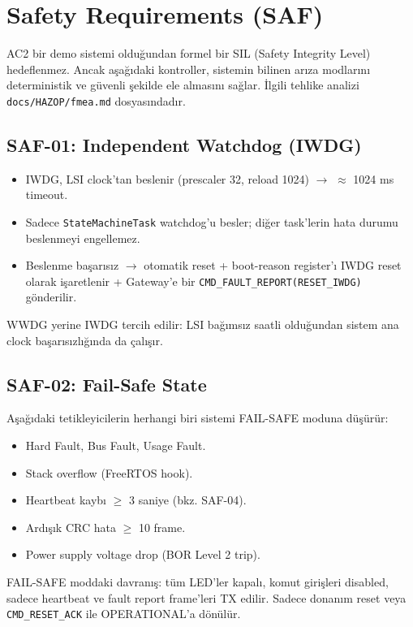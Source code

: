 \section{Safety Requirements (SAF)}

AC2 bir demo sistemi olduğundan formel bir SIL (Safety Integrity Level) hedeflenmez. Ancak aşağıdaki kontroller, sistemin bilinen arıza modlarını deterministik ve güvenli şekilde ele almasını sağlar. İlgili tehlike analizi \texttt{docs/HAZOP/fmea.md} dosyasındadır.

\subsection{SAF-01: Independent Watchdog (IWDG)}
\begin{itemize}
    \item IWDG, LSI clock'tan beslenir (prescaler 32, reload 1024) $\rightarrow$ $\approx$ 1024 ms timeout.
    \item Sadece \texttt{StateMachineTask} watchdog'u besler; diğer task'lerin hata durumu beslenmeyi engellemez.
    \item Beslenme başarısız $\rightarrow$ otomatik reset + boot-reason register'ı IWDG reset olarak işaretlenir + Gateway'e bir \texttt{CMD\_FAULT\_REPORT(RESET\_IWDG)} gönderilir.
\end{itemize}
WWDG yerine IWDG tercih edilir: LSI bağımsız saatli olduğundan sistem ana clock başarısızlığında da çalışır.

\subsection{SAF-02: Fail-Safe State}
Aşağıdaki tetikleyicilerin herhangi biri sistemi FAIL-SAFE moduna düşürür:
\begin{itemize}
    \item Hard Fault, Bus Fault, Usage Fault.
    \item Stack overflow (FreeRTOS hook).
    \item Heartbeat kaybı $\geq$ 3 saniye (bkz. SAF-04).
    \item Ardışık CRC hata $\geq$ 10 frame.
    \item Power supply voltage drop (BOR Level 2 trip).
\end{itemize}
FAIL-SAFE moddaki davranış: tüm LED'ler kapalı, komut girişleri disabled, sadece heartbeat ve fault report frame'leri TX edilir. Sadece donanım reset veya \texttt{CMD\_RESET\_ACK} ile OPERATIONAL'a dönülür.

